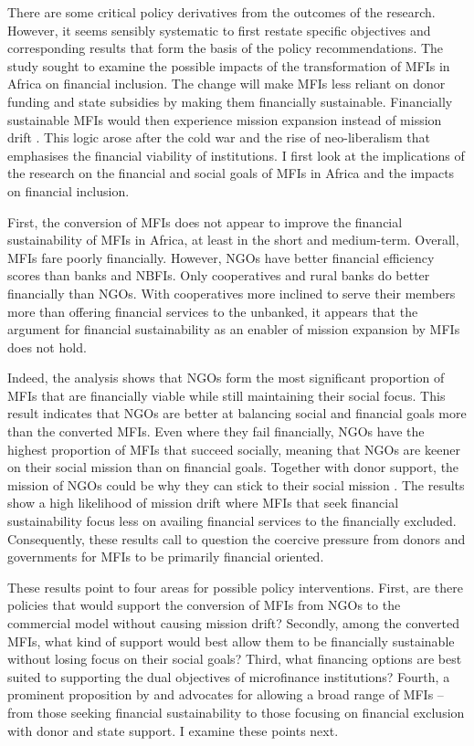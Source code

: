 \documentclass[a4paper, nobind]{templates/ociamthesis}
\begin{document}
There are some critical policy derivatives from the outcomes of the research. However, it seems sensibly systematic to first restate specific objectives and corresponding results that form the basis of the policy recommendations. The study sought to examine the possible impacts of the transformation of MFIs in Africa on financial inclusion. The change will make MFIs less reliant on donor funding and state subsidies by making them financially sustainable. Financially sustainable MFIs would then experience mission expansion instead of mission drift \autocite{mersland2010microfinance}. This logic arose after the cold war and the rise of neo-liberalism that emphasises the financial viability of institutions. I first look at the implications of the research on the financial and social goals of MFIs in Africa and the impacts on financial inclusion.

First, the conversion of MFIs does not appear to improve the financial sustainability of MFIs in Africa, at least in the short and medium-term. Overall, MFIs fare poorly financially. However, NGOs have better financial efficiency scores than banks and NBFIs. Only cooperatives and rural banks do better financially than NGOs. With cooperatives more inclined to serve their members more than offering financial services to the unbanked, it appears that the argument for financial sustainability as an enabler of mission expansion by MFIs does not hold.

Indeed, the analysis shows that NGOs form the most significant proportion of MFIs that are financially viable while still maintaining their social focus. This result indicates that NGOs are better at balancing social and financial goals more than the converted MFIs. Even where they fail financially, NGOs have the highest proportion of MFIs that succeed socially, meaning that NGOs are keener on their social mission than on financial goals. Together with donor support, the mission of NGOs could be why they can stick to their social mission \autocite{berbegal2019impact}. The results show a high likelihood of mission drift where MFIs that seek financial sustainability focus less on availing financial services to the financially excluded. Consequently, these results call to question the coercive pressure from donors and governments for MFIs to be primarily financial oriented.

These results point to four areas for possible policy interventions. First, are there policies that would support the conversion of MFIs from NGOs to the commercial model without causing mission drift? Secondly, among the converted MFIs, what kind of support would best allow them to be financially sustainable without losing focus on their social goals? Third, what financing options are best suited to supporting the dual objectives of microfinance institutions? Fourth, a prominent proposition by \textcite{morduch1999microfinance} and \textcite{morduch2000microfinance} advocates for allowing a broad range of MFIs -- from those seeking financial sustainability to those focusing on financial exclusion with donor and state support. I examine these points next.
\end{document}
